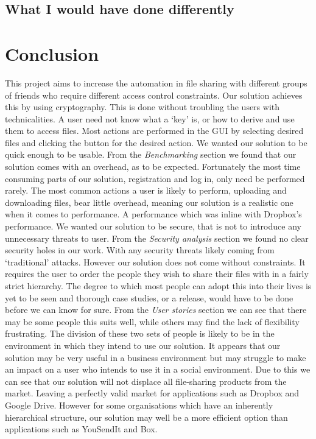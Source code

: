 \documentclass[12pt, titlepage]{article}
\begin{document}
\subsection{What I would have done differently}

\section{Conclusion}
This project aims to increase the automation in file sharing with different groups of friends who require different access control constraints. Our solution achieves this by using cryptography. This is done without troubling the users with technicalities. A user need not know what a `key' is, or how to derive and use them to access files. Most actions are performed in the GUI by selecting desired files and clicking the button for the desired action.
\newline \indent We wanted our solution to be quick enough to be usable. From the \textit{Benchmarking} section we found that our solution comes with an overhead, as to be expected. Fortunately the most time consuming parts of our solution, registration and log in, only need be performed rarely. The most common actions a user is likely to perform, uploading and downloading files, bear little overhead, meaning our solution is a realistic one when it comes to performance. A performance which was inline with Dropbox's performance.
\newline \indent We wanted our solution to be secure, that is not to introduce any unnecessary threats to user. From the \textit{Security analysis} section we found no clear security holes in our work. With any security threats likely coming from `traditional' attacks.
\newline \indent However our solution does not come without constraints. It requires the user to order the people they wish to share their files with in a fairly strict hierarchy. The degree to which most people can adopt this into their lives is yet to be seen and thorough case studies, or a release, would have to be done before we can know for sure. From the \textit{User stories} section we can see that there may be some people this suits well, while others may find the lack of flexibility frustrating. The division of these two sets of people is likely to be in the environment in which they intend to use our solution. It appears that our solution may be very useful in a business environment but may struggle to make an impact on a user who intends to use it in a social environment. Due to this we can see that our solution will not displace all file-sharing products from the market. Leaving a perfectly valid market for applications such as Dropbox and Google Drive. However for some organisations which have an inherently hierarchical structure, our solution may well be a more efficient option than applications such as YouSendIt and Box.
\end{document}
